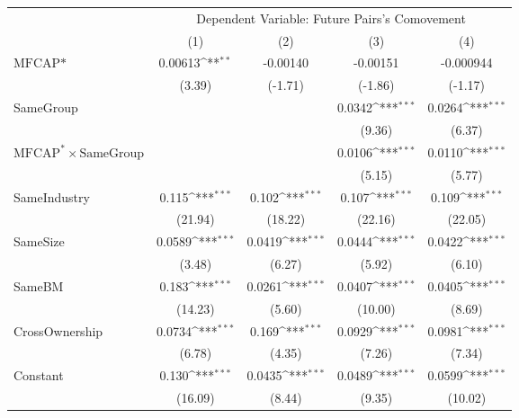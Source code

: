 {
\def\sym#1{\ifmmode^{#1}\else\(^{#1}\)\fi}
\begin{tabular}{l*{4}{c}}
\hline\hline
                &\multicolumn{4}{c}{Dependent Variable:  Future Pairs's Comovement}         \\\cmidrule(lr){2-5}
                &\multicolumn{1}{c}{(1)}         &\multicolumn{1}{c}{(2)}         &\multicolumn{1}{c}{(3)}         &\multicolumn{1}{c}{(4)}         \\
\hline
$ \text{MFCAP*} $&  0.00613\sym{**} & -0.00140         & -0.00151         &-0.000944         \\
                &   (3.39)         &  (-1.71)         &  (-1.86)         &  (-1.17)         \\
[1em]
SameGroup       &                  &                  &   0.0342\sym{***}&   0.0264\sym{***}\\
                &                  &                  &   (9.36)         &   (6.37)         \\
[1em]
 $ \text{MFCAP}^* \times {\text{SameGroup} }  $ &                  &                  &   0.0106\sym{***}&   0.0110\sym{***}\\
                &                  &                  &   (5.15)         &   (5.77)         \\
[1em]
SameIndustry    &    0.115\sym{***}&    0.102\sym{***}&    0.107\sym{***}&    0.109\sym{***}\\
                &  (21.94)         &  (18.22)         &  (22.16)         &  (22.05)         \\
[1em]
SameSize        &   0.0589\sym{***}&   0.0419\sym{***}&   0.0444\sym{***}&   0.0422\sym{***}\\
                &   (3.48)         &   (6.27)         &   (5.92)         &   (6.10)         \\
[1em]
SameBM          &    0.183\sym{***}&   0.0261\sym{***}&   0.0407\sym{***}&   0.0405\sym{***}\\
                &  (14.23)         &   (5.60)         &  (10.00)         &   (8.69)         \\
[1em]
CrossOwnership  &   0.0734\sym{***}&    0.169\sym{***}&   0.0929\sym{***}&   0.0981\sym{***}\\
                &   (6.78)         &   (4.35)         &   (7.26)         &   (7.34)         \\
[1em]
Constant        &    0.130\sym{***}&   0.0435\sym{***}&   0.0489\sym{***}&   0.0599\sym{***}\\
                &  (16.09)         &   (8.44)         &   (9.35)         &  (10.02)         \\

\end{tabular}}
